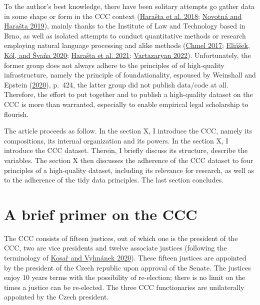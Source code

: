 \documentclass[
  11pt,
]{article}
\begin{document}
To the author's best knowledge, there have been solitary attempts go
gather data in some shape or form in the CCC context
(\protect\hyperlink{ref-harastaAnnotatedCorpusCzech2018}{Harašta et al.
2018}; \protect\hyperlink{ref-novotnaCzechCourtDecisions2019}{Novotná
and Harašta 2019}), mainly thanks to the Institute of Law and Technology
based in Brno, as well as isolated attempts to conduct quantitative
methods or research employing natural language processing and alike
methods (\protect\hyperlink{ref-chmelZpravodajoveSenatyVliv2017}{Chmel
2017};
\protect\hyperlink{ref-eliasekAutomatickaKlasifikaceVyznamovych2020}{Eliášek,
Kól, and Švaňa 2020};
\protect\hyperlink{ref-harastaCitacniAnalyzaJudikatury2021}{Harašta et
al. 2021};
\protect\hyperlink{ref-vartazaryanSitOvaAnalyza2022}{Vartazaryan 2022}).
Unfortunately, the former group does not always adhere to the principles
of of high-quality infrastructure, namely the principle of
foundationality, espoused by Weinshall and Epstein
(\protect\hyperlink{ref-weinshallDevelopingHighQualityData2020}{2020}),
p.~424, the latter group did not publish data/code at all. Therefore,
the effort to put together and to publish a high-quality dataset on the
CCC is more than warranted, especially to enable empirical legal
scholarship to flourish.

The article proceeds as follow. In the section X, I introduce the CCC,
namely its compositions, its internal organization and its powers. In
the section X, I introduce the CCC dataset. Therein, I briefly discuss
its structure, describe the variables. The section X then discusses the
adherence of the CCC dataset to four principles of a high-quality
dataset, including its relevance for research, as well as to the
adherence of the tidy data principles. The last section concludes.

\hypertarget{a-brief-primer-on-the-ccc}{%
\section{A brief primer on the CCC}\label{a-brief-primer-on-the-ccc}}

The CCC consists of fifteen justices, out of which one is the president
of the CCC, two are vice presidents and twelve associate justices
(following the terminology of
\protect\hyperlink{ref-kosarConstitutionalCourtCzechia2020}{Kosař and
Vyhnánek 2020}). These fifteen justices are appointed by the president
of the Czech republic upon approval of the Senate. The justices enjoy 10
years terms with the possibility of re-election; there is no limit on
the times a justice can be re-elected. The three CCC functionaries are
unilaterally appointed by the Czech president.
\end{document}
